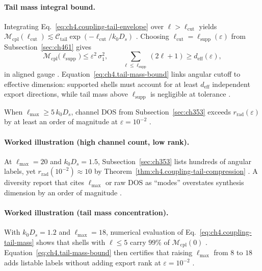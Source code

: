 \paragraph{Tail mass integral bound.}
Integrating Eq.~\eqref{eq:ch4.coupling-tail-envelope} over \(\ell>\ell_{\mathrm{cut}}\) yields
\(\mathcal{M}_{\mathrm{cpl}}(\ell_{\mathrm{cut}})\lesssim\mathcal{C}_{\mathrm{tail}}\exp(-\ell_{\mathrm{cut}}/k_{0}D_{s})\) \cite{hansen1988,stratton1941,harrington2001}.
Choosing \(\ell_{\mathrm{cut}}=\ell_{\mathrm{supp}}(\varepsilon)\) from Subsection~\ref{sec:ch461} gives
\begin{equation}
\label{eq:ch4.tail-mass-bound}
\mathcal{M}_{\mathrm{cpl}}\big(\ell_{\mathrm{supp}}\big)
\le
\varepsilon^{2}\,\sigma_{1}^{2},
\qquad
\sum_{\ell\le\ell_{\mathrm{supp}}}(2\ell+1)
\ge
d_{\mathrm{eff}}(\varepsilon),
\end{equation}
in aligned gauge \cite{harrington2001,devaney2004,hansen1988}. Equation~\eqref{eq:ch4.tail-mass-bound} links angular cutoff to effective
dimension: supported shells must account for at least \(d_{\mathrm{eff}}\) independent export directions, while tail mass above
\(\ell_{\mathrm{supp}}\) is negligible at tolerance \cite{stratton1941,jackson1999,collin2001}.

\begin{corollary}
\label{cor:ch4.dos-overcount}
When \(\ell_{\max}\ge5\,k_{0}D_{s}\), channel DOS from Subsection~\ref{sec:ch353} exceeds
\(r_{\mathrm{rad}}(\varepsilon)\) by at least an order of magnitude at \(\varepsilon=10^{-2}\) \cite{hansen1988,harrington2001,devaney2004}.
\end{corollary}

\paragraph{Worked illustration (high channel count, low rank).}
At \(\ell_{\max}=20\) and \(k_{0}D_{s}=1.5\), Subsection~\ref{sec:ch353} lists hundreds of angular labels, yet
\(r_{\mathrm{rad}}(10^{-2})\approx10\) by Theorem~\ref{thm:ch4.coupling-tail-compression} \cite{hansen1988,harrington2001,devaney2004,jackson1999}.
A diversity report that cites \(\ell_{\max}\) or raw DOS as ``modes'' overstates synthesis dimension by an order of magnitude
\cite{stratton1941,collin2001}.

\paragraph{Worked illustration (tail mass concentration).}
With \(k_{0}D_{s}=1.2\) and \(\ell_{\max}=18\), numerical evaluation of Eq.~\eqref{eq:ch4.coupling-tail-mass} shows that shells with
\(\ell\le5\) carry \(99\%\) of \(\mathcal{M}_{\mathrm{cpl}}(0)\) \cite{hansen1988,devaney2004,harrington2001}. Equation~\eqref{eq:ch4.tail-mass-bound}
then certifies that raising \(\ell_{\max}\) from \(8\) to \(18\) adds listable labels without adding export rank at \(\varepsilon=10^{-2}\)
\cite{stratton1941,jackson1999}.

